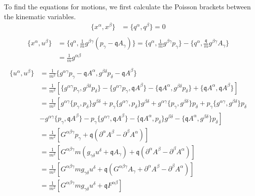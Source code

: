 To find the equations for motions, we first calculate the Poisson brackets between the kinematic variables.
\begin{equation}
	\begin{aligned}
		\{x^\alpha, x^\beta\} &= \{q^\alpha, q^\beta\} = 0 \\
	\end{aligned}
\end{equation}
\begin{equation}
\begin{aligned}
		\{x^\alpha, u^\beta\} &= \{q^\alpha, \frac{1}{m} g^{\beta\gamma}(p_\gamma - \mathfrak{q} A_\gamma)\} = \{q^\alpha, \frac{1}{m} g^{\beta\gamma} p_\gamma\} - \{q^\alpha, \frac{\mathfrak{q}}{m} g^{\beta\gamma} A_\gamma\} \\
		&= \frac{1}{m} g^{\alpha\beta} \\
\end{aligned}
\end{equation}
\begin{equation}
\begin{aligned}
		\{u^\alpha, u^\beta\} &= \frac{1}{m^2} \{g^{\alpha \gamma} 	p_\gamma - \mathfrak{q} A^\alpha, g^{\beta \delta} p_\delta - \mathfrak{q} A^\beta\} \\
		&= \frac{1}{m^2}\left[ \{g^{\alpha \gamma} p_\gamma, g^{\beta \delta} p_\delta\} - \{g^{\alpha \gamma} p_\gamma, \mathfrak{q} A^\beta\} - \{\mathfrak{q} A^\alpha , g^{\beta \delta} p_\delta \} + \{\mathfrak{q} A^\alpha , \mathfrak{q} A^\beta\} \right]\\
		&= \frac{1}{m^2}\left[ g^{\alpha \gamma} \{p_\gamma, p_\delta\} g^{\beta \delta} + p_\gamma \{g^{\alpha \gamma}, p_\delta\} g^{\beta \delta} + g^{\alpha \gamma} \{p_\gamma, g^{\beta \delta}\} p_\delta + p_\gamma \{g^{\alpha \gamma}, g^{\beta \delta}\} p_\delta \right.\\
		&\left. - g^{\alpha \gamma} \{p_\gamma, \mathfrak{q} A^\beta\} - p_\gamma \{g^{\alpha \gamma} , \mathfrak{q} A^\beta\} - \{\mathfrak{q} A^\alpha , p_\delta \} g^{\beta \delta} - \{\mathfrak{q} A^\alpha , g^{\beta \delta} \} p_\delta \right]\\
		&= \frac{1}{m^2}\left[ G^{\alpha\beta\gamma} p_\gamma  + \mathfrak{q} (\partial^\alpha A^\beta - \partial^\beta A^\alpha) \right] \\
		&= \frac{1}{m^2}\left[ G^{\alpha \beta \gamma} m ( g_{\gamma \delta} u^\delta + \mathfrak{q} A_\gamma ) + \mathfrak{q} (\partial^\alpha A^\beta - \partial^\beta A^\alpha) \right] \\
		&= \frac{1}{m^2}\left[ G^{\alpha \beta \gamma} m g_{\gamma \delta} u^\delta + \mathfrak{q} (G^{\alpha \beta \gamma} A_\gamma + \partial^\alpha A^\beta - \partial^\beta A^\alpha) \right] \\
		&= \frac{1}{m^2}\left[ G^{\alpha \beta \gamma} m g_{\gamma \delta} u^\delta +  \mathfrak{q} F^{\alpha \beta} \right] \\
	\end{aligned}
\end{equation}

